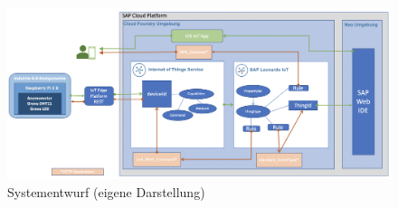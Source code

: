 \begin{figure}[H]
  \centering
  \includegraphics[angle=90, scale=0.5]{pictures/systemcustom}
  \caption[Systementwurf]{Systementwurf (eigene Darstellung)}
  \label{systemcustom}
\end{figure}


\newpage